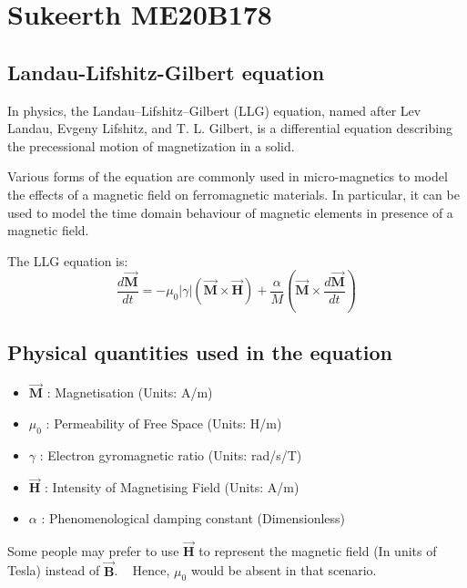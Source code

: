 	
	\section{Sukeerth ME20B178}
	{
		\vspace{0.5cm}
		\subsection{Landau-Lifshitz-Gilbert equation}
		{
			\vspace{0.25cm}
			\large
			In physics, the Landau–Lifshitz–Gilbert (LLG) equation, named after Lev Landau, Evgeny Lifshitz, and T. L. Gilbert, is a differential equation describing the precessional motion of magnetization in a solid. \newline

			Various forms of the equation are commonly used in micro-magnetics to model the effects of a magnetic field on ferromagnetic materials. In particular, it can be used to model the time domain behaviour of magnetic elements in presence of a magnetic field. \newline

			The LLG equation is:
			\begin{equation}
				\frac{d\overrightarrow{\mathbf{M}}}{dt}=-\mu_0|\gamma| \left(\overrightarrow{\mathbf{M}} \times \overrightarrow{\mathbf{H}}\right)+\frac{\alpha}{M}\left(\overrightarrow{\mathbf{M}} \times\frac{d\overrightarrow{\mathbf{M}}}{dt}\right)
				\label{eqn:LLG}
			\end{equation}
		
		}

		\subsection{Physical quantities used in the equation}
		{
			\vspace{0.25cm}
			\large
			\begin{itemize}
				\item $\overrightarrow{\mathbf{M}}$ : Magnetisation (Units: A/m)
				\item $\mu_0$ : Permeability of Free Space (Units: H/m)
				\item $\gamma$ : Electron gyromagnetic ratio (Units: rad/s/T)
				\item $\overrightarrow{\mathbf{H}}$ : Intensity of Magnetising Field (Units: A/m)	
				\item $\alpha$ : Phenomenological damping constant (Dimensionless)		
			\end{itemize}
			Some people may prefer to use $\overrightarrow{\mathbf{H}}$ to represent the magnetic field (In units of Tesla) instead of $\overrightarrow{\mathbf{B}}$. ~\cite{Mallinson20001976}
			Hence, $\mu_0$ would be absent in that scenario.
		}

}
